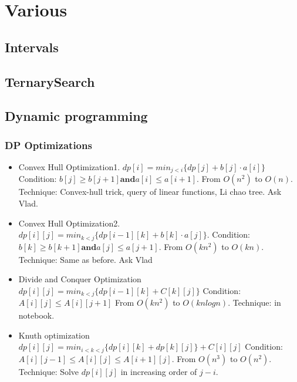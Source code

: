 \chapter{Various}

\section{Intervals}

\section{TernarySearch}

\section{Dynamic programming}
    \subsection{DP Optimizations}
        \begin{itemize}
            \item Convex Hull Optimization1.
                  $dp[i]=min_{j<i} \{dp[j]+b[j]\cdot a[i]\}$
                  Condition: $b[j] \geq b[j + 1] \textbf{and} a[i]\leq a[i+1]$.
                  From $O(n^2)$ to $O(n)$. Technique: Convex-hull trick, query of linear functions, Li chao tree. Ask Vlad.
            \item Convex Hull Optimization2.
                  $dp[i][j] = min_{k<j}\{dp[i-1][k]+b[k]\cdot a[j]\}$.
                  Condition: $b[k] \geq b[k+1] \textbf{and} a[j] \leq a[j+1]$.
                  From $O(kn^2)$ to $O(kn)$. Technique: Same as before. Ask Vlad
            \item Divide and Conquer Optimization
                  $dp[i][j] = min_{k<j} \{ dp[i-1][k] + C[k][j] \} $
                  Condition: $A[i][j] \leq A[i][j + 1]$
                  From $O(kn^2)$ to $O(kn logn)$. Technique: in notebook.
            \item Knuth optimization
                  $dp[i][j] = min_{i<k<j} \{ dp[i][k] + dp[k][j] \} + C[i][j]$
                  Condition: $A[i][j-1] \leq A[i][j] \leq A[i + 1][j]$.
                  From $O(n^3)$ to $O(n^2)$. Technique: Solve $dp[i][j]$ in increasing order of $j-i$.
        \end{itemize}


